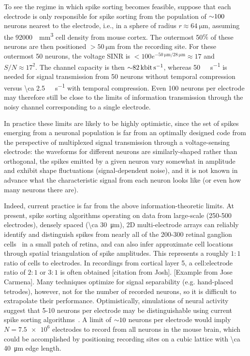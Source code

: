 To see the regime in which spike sorting becomes feasible, suppose that each electrode is only responsible for spike sorting from the population of ${\sim} \num{100}$ neurons nearest to the electrode, i.e., in a sphere of radius $r \approx \SI{64}{\micro\meter}$, assuming the \SI{92000}{\per\milli\meter\cubed} cell density from mouse cortex. The outermost \num{50}$\%$ of these neurons are then positioned $>\SI{50}{\micro\meter}$ from the recording site. For these outermost \num{50} neurons, the voltage SINR is $ < \num{100} e^{-\SI{50}{\micro\meter}/\SI{28}{\micro\meter}} \approx \num{17}$ and $S/N \approx 17^2$. The channel capacity is then $\ca \SI{82}{\kilo\bit\per\second}$, whereas \SI{50}{\kilo\bit\per\second} is needed for signal transmission from \num{50} neurons without temporal compression versus \SI{\ca 2.5}{\kilo\bit\per\second} with temporal compression. Even 100 neurons per electrode may therefore still be close to the limits of information transmission through the noisy channel corresponding to a single electrode.

In practice these limits are likely to be highly optimistic, since the set of spikes emerging from a neuronal population is far from an optimally designed code from the perspective of multiplexed signal transmission through a voltage-sensing electrode: the waveforms for different neurons are similarly-shaped rather than orthogonal, the spikes emitted by a given neuron vary somewhat in amplitude and exhibit shape fluctuations (signal-dependent noise), and it is not known in advance what the characteristic signal from each neuron looks like (or even how many neurons there are). 

Indeed, current practice is far from the above information-theoretic limits. At present, spike sorting algorithms operating on data from large-scale (\num{250}-\num{500} electrodes), densely spaced (\SI{\ca 30}{\micro\meter}), 2D multi-electrode arrays can reliably identify and distinguish spikes from nearly all of the \num{200}-\num{300} retinal ganglion cells~\cite{marre12,pillow13} in a small patch of retina, and can also infer approximate cell locations through spatial triangulation of spike amplitudes.  This represents a roughly $1:1$ ratio of cells to electrodes. In recordings from cortical layer 5, a $\text{cell}:\text{electrode}$ ratio of $2:1$ or $3:1$ is often obtained [citation from Josh]. [Example from Jose Carmena]. Many techniques optimize for signal separability (e.g. hand-placed tetrodes), however, not for the number of recorded neurons, so it is difficult to extrapolate their performance. Optimistically, simulations of neural activity suggest that \num{5}-\num{10} neurons per electrode may be distinguishable using current spike sorting algorithms~\cite{pedreira12,sahani99,camunas13}. A limit of ${\sim}\num{10}$ neurons per electrode would imply $N=\num{7.5e6}$ electrodes to record from all neurons in the mouse brain, which could be accomplished by positioning recording sites on a cubic lattice with \SI{\ca 40}{\micro\meter} edge length.

